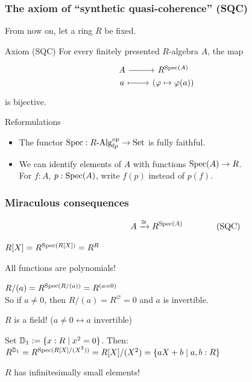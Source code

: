 \documentclass[aspectratio=1610]{beamer}
\begin{document}
\begin{frame}[fragile] %
  \frametitle{The axiom of \enquote{synthetic quasi-coherence} (SQC)}

  From now on, let a ring $R$ be fixed.

  \begin{block}{Axiom (SQC)}
    For every finitely presented $R$-algebra $A$,
    the map
    \[\begin{tikzcd}[row sep=0pt]
      A \ar[r] & R^{\Spec(A)} \\
      a \ar[r, mapsto] & (\varphi \mapsto \varphi(a))
    \end{tikzcd}\]
    is bijective.
  \end{block}

  \pause%
  \begin{block}{Reformulations}
    \begin{itemize}
      \item
        The functor $\operatorname{Spec} : R\text{-}\mathrm{Alg}_{\mathrm{fp}}^{\mathrm{op}} \to \mathrm{Set}$ is fully faithful.
      \pause%
      \item
        We can identify elements of $A$ with functions $\operatorname{Spec}(A) \to R$.\\
        For $f : A$, $p : \operatorname{Spec}(A)$, write $f(p)$ instead of $p(f)$.
    \end{itemize}
  \end{block}
\end{frame}

\begin{frame}
  \frametitle{Miraculous consequences}

  \[A \xrightarrow{\cong} R^{\Spec(A)} \rlap{\qquad\qquad \text{(SQC)}}\]

  \pause%
  \begin{corollary}
    $R[X] = R^{\operatorname{Spec}(R[X])} = R^R$
  \end{corollary}
  \pause%
  \alert{All functions are polynomials!}

  \pause%
  \begin{corollary}
    $R/(a) = R^{\operatorname{Spec}(R/(a))} = R^{(a = 0)}$\\
    So if $a \neq 0$, then $R/(a) = R^{\varnothing} = 0$ and $a$ is invertible.
  \end{corollary}
  \pause%
  \alert{$R$ is a field! ($a \neq 0 \leftrightarrow \text{$a$ invertible}$)}

  \pause%
  \begin{corollary}
    Set $\mathbb{D}_1 := \{x : R \mid x^2 = 0\}$. Then:\\
    $R^{\mathbb{D}_1} = R^{\operatorname{Spec}(R[X]/(X^2))} = R[X]/(X^2) = \{ aX + b \mid a, b : R \}$
  \end{corollary}
  \pause%
  \alert{$R$ has infinitesimally small elements!}
\end{frame}
\end{document}
